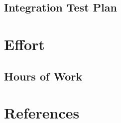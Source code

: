 \documentclass[12pt, a4paper]{report}
\begin{document}
\section{Integration Test Plan}


\chapter{Effort}
\label{ch:effort}

\section{Hours of Work}


\chapter{References}



%

%
\end{document}
